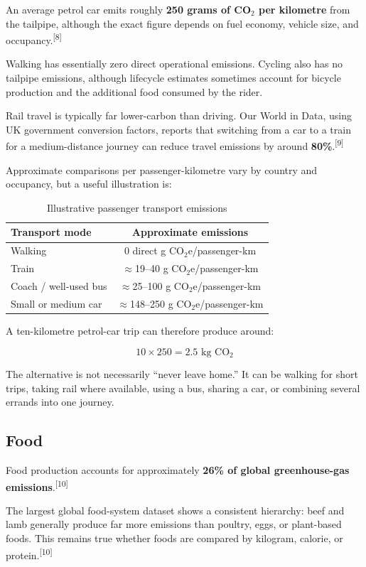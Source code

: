 \documentclass{article}
\begin{document}
An average petrol car emits roughly \textbf{250 grams of CO$_2$ per kilometre} from the tailpipe, although the exact figure depends on fuel economy, vehicle size, and occupancy.\textsuperscript{[8]}

Walking has essentially zero direct operational emissions. Cycling also has no tailpipe emissions, although lifecycle estimates sometimes account for bicycle production and the additional food consumed by the rider.

Rail travel is typically far lower-carbon than driving. Our World in Data, using UK government conversion factors, reports that switching from a car to a train for a medium-distance journey can reduce travel emissions by around \textbf{80\%}.\textsuperscript{[9]}

Approximate comparisons per passenger-kilometre vary by country and occupancy, but a useful illustration is:

\begin{table}[h]
\centering
\begin{tabular}{lc}
\toprule
\textbf{Transport mode} & \textbf{Approximate emissions} \\
\midrule
Walking & 0 direct g CO$_2$e/passenger-km \\
Train & $\approx$19--40 g CO$_2$e/passenger-km \\
Coach / well-used bus & $\approx$25--100 g CO$_2$e/passenger-km \\
Small or medium car & $\approx$148--250 g CO$_2$e/passenger-km \\
\bottomrule
\end{tabular}
\caption{Illustrative passenger transport emissions}
\end{table}

A ten-kilometre petrol-car trip can therefore produce around:

\[
10 \times 250 = 2.5 \text{ kg CO$_2$}
\]

The alternative is not necessarily ``never leave home.'' It can be walking for short trips, taking rail where available, using a bus, sharing a car, or combining several errands into one journey.

\subsection*{Food}

Food production accounts for approximately \textbf{26\% of global greenhouse-gas emissions}.\textsuperscript{[10]}

The largest global food-system dataset shows a consistent hierarchy: beef and lamb generally produce far more emissions than poultry, eggs, or plant-based foods. This remains true whether foods are compared by kilogram, calorie, or protein.\textsuperscript{[10]}
\end{document}
